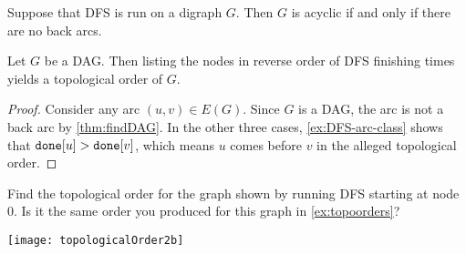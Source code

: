 \begin{Theorem} \label{thm:findDAG}
Suppose that DFS is run on a digraph $G$. Then $G$ is acyclic if and only if there are no back arcs.
\end{Theorem}
%

\begin{Theorem}
Let $G$ be a DAG. Then listing the nodes in reverse order of DFS
finishing times yields a topological order of $G$.
\end{Theorem}
\begin{proof} 
Consider any arc $(u,v) \in E(G)$. 
Since $G$ is a DAG, the arc is not a back arc by \cref{thm:findDAG}. 
In the other three cases, \cref{ex:DFS-arc-class} shows that $\operatorname{\text{\texttt{done}}}[u] > \operatorname{\text{\texttt{done}}}[v]$,
which means $u$ comes before $v$ in the alleged topological order.
\end{proof}




\begin{Boxample}[1] 
Find the topological order for the graph shown by running DFS starting at node $0$.  
Is it the same order you produced for this graph in \cref{ex:topoorders}?
\begin{center}
\texttt{[image: topologicalOrder2b]}
\end{center}
\end{Boxample}


